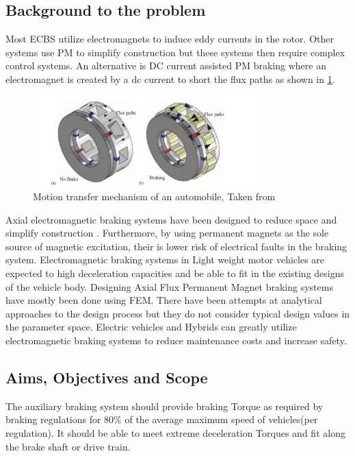 \documentclass[lettersize,journal]{IEEEtran}
\begin{document}
\subsection{Background to the problem}
Most ECBS \cite{putra_2021_mini,gulec_2016_design,shi_2013_study} utilize electromagnets to induce eddy currents in the rotor. Other systems use PM \cite{fontchastagner_2017_axialfield,fontchastagner_2018_design,shin_2013_analytical} to simplify construction but these systems then require complex control systems. An alternative is DC current assisted PM braking where an electromagnet is created by a dc current to short the flux paths as shown in \ref{fig2}. 
\begin{figure}[!t]
\centering
\includegraphics[width=3.5in]{images/fig3.png}
\caption{Motion transfer mechanism of an automobile, Taken from \cite{takawane_2019_car}}
\label{fig2}
\end{figure}
Axial electromagnetic braking systems have been designed to reduce space and simplify construction \cite{waloyo_ubaidillah_tjahjana_nizam_koga_2019}. Furthermore, by using permanent magnets as the sole source of magnetic excitation, their is lower risk of electrical faults in the braking system. Electromagnetic braking systems in Light weight motor vehicles are expected to high deceleration capacities and be able to fit in the existing designs of the vehicle body. Designing Axial Flux Permanent Magnet braking systems have mostly been done using FEM. There have been attempts at analytical approaches to the design process but they do not consider typical design values in the parameter space. Electric vehicles and Hybrids can greatly utilize electromagnetic braking systems to reduce maintenance costs and increase safety.

\subsection{Aims, Objectives and Scope}
The auxiliary braking system should provide braking Torque as required by braking regulations for 80\% of the average maximum speed of vehicles(per regulation). It should be able to meet extreme deceleration Torques and fit along the brake shaft or drive train.
\end{document}
